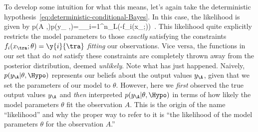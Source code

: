 To develop some intuition for what this means, let's again take the deterministic hypothesis~\eqref{eq:deterministic-conditional-Bayes}. In this case, the likelihood is given by
\be\label{eq:posterior-deterministic-hypothesis}
p(A \vert \theta,\Hypo)\equiv p(y_{\A} \vert \theta,\Hypo)=\prod_{\tra\in\A}\prod_{i=1}^{n_{L}}\delta\Big(-f_i(x_{\tra};\theta)\Big)\, .
\ee
This likelihood quite explicitly restricts
the model parameters to those \emph{exactly} satisfying the constraints $f_i(x_{\tra};\theta)=\y{i}{\tra}$ \emph{fitting} our observations.
Vice versa, the functions in our set that do \emph{not} satisfy these constraints are completely thrown away from the posterior distribution, deemed \emph{unlikely}.
Note what has just happened. Naively, $p(y_{\A}  \vert \theta,\Hypo)$ represents our beliefs about the output values $y_{\A}$, given that we set the parameters of our model to $\theta$. However, here we \emph{first} observed the true output values $y_{\A}$ and \emph{then} interpreted $p(y_{\A}  \vert \theta,\Hypo)$ in terms of how likely the model parameters $\theta$ fit the observation $A$.
This is the origin of the name ``likelihood'' and why the proper way to refer to it is ``the likelihood of the model parameters $\theta$ for the observation $A$.''

